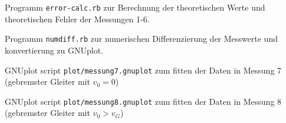\documentclass[a4paper,german,12pt,smallheadings]{scrartcl}
\begin{document}
Programm \texttt{error-calc.rb} zur Berechnung der theoretischen Werte und
theoretischen Fehler der Messungen 1-6.



Programm \texttt{numdiff.rb} zur numerischen Differenzierung der Messwerte und
konvertierung zu GNUplot.


GNUplot script \texttt{plot/messung7.gnuplot} zum fitten der Daten in Messung 7
(gebremster Gleiter mit $v_0 = 0$)


GNUplot script \texttt{plot/messung8.gnuplot} zum fitten der Daten in Messung 8
(gebremster Gleiter mit $v_0 > v_G$)

\end{document}
